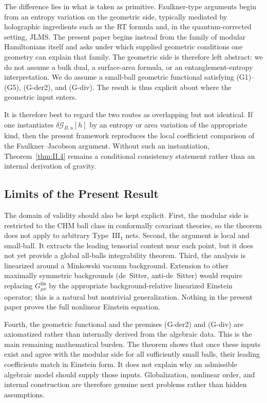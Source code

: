 \documentclass[12pt]{article}
\theoremstyle{definition}
\theoremstyle{remark}
\begin{document}
The difference lies in what is taken as primitive. Faulkner-type arguments begin from an entropy variation on the geometric side, typically mediated by holographic ingredients such as the RT formula\cite{RyuTakayanagi2006} and, in the quantum-corrected setting, JLMS\cite{JLMS2016}. The present paper begins instead from the family of modular Hamiltonians itself and asks under which supplied geometric conditions one geometry can explain that family. The geometric side is therefore left abstract: we do not assume a bulk dual, a surface-area formula, or an entanglement-entropy interpretation. We do assume a small-ball geometric functional satisfying (G1)--(G5), (G-der2), and (G-div). The result is thus explicit about where the geometric input enters.

It is therefore best to regard the two routes as overlapping but not identical. If one instantiates \(\delta\mathcal{G}_{B,u}[h]\) by an entropy or area variation of the appropriate kind, then the present framework reproduces the local coefficient comparison of the Faulkner--Jacobson argument. Without such an instantiation, Theorem~\ref{thm:II.4} remains a conditional consistency statement rather than an internal derivation of gravity.

\subsection{Limits of the Present Result}\label{subsec:6.3}

The domain of validity should also be kept explicit. First, the modular side is restricted to the CHM ball class in conformally covariant theories, so the theorem does not apply to arbitrary Type~III$_1$ nets. Second, the argument is local and small-ball. It extracts the leading tensorial content near each point, but it does not yet provide a global all-balls integrability theorem. Third, the analysis is linearized around a Minkowski vacuum background. Extension to other maximally symmetric backgrounds (de~Sitter, anti-de~Sitter) would require replacing \(G^{\mathrm{lin}}_{\mu\nu}\) by the appropriate background-relative linearized Einstein operator; this is a natural but nontrivial generalization. Nothing in the present paper proves the full nonlinear Einstein equation.

Fourth, the geometric functional and the premises (G-der2) and (G-div) are axiomatized rather than internally derived from the algebraic data. This is the main remaining mathematical burden. The theorem shows that once these inputs exist and agree with the modular side for all sufficiently small balls, their leading coefficients match in Einstein form. It does not explain why an admissible algebraic model should supply those inputs. Globalization, nonlinear order, and internal construction are therefore genuine next problems rather than hidden assumptions.
\end{document}
